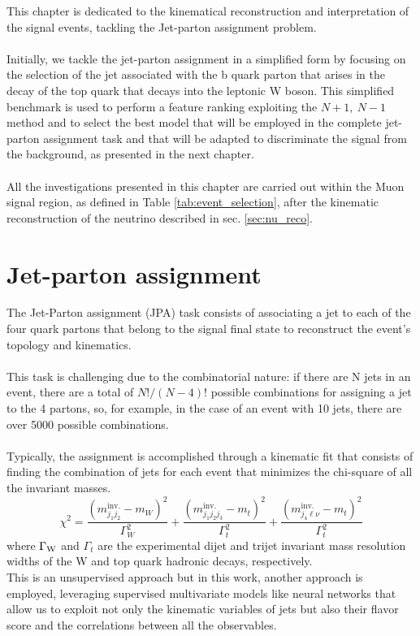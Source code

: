 \label{sec:kin}
\vspace{-1cm}
\minitoc
\vspace{0.5cm}
This chapter is dedicated to the kinematical reconstruction and interpretation of the signal events, tackling the Jet-parton assignment problem.
\\
\\
Initially, we tackle the jet-parton assignment in a simplified form by focusing on the selection of the jet associated with the b quark parton that arises in the decay of the top quark that decays into the leptonic W boson. This simplified benchmark is used to perform a feature ranking exploiting the $N+1,\: N-1$ method and to select the best model that will be employed in the complete jet-parton assignment task and that will be adapted to discriminate the signal from the background, as presented in the next chapter.
\\
\\
All the investigations presented in this chapter are carried out within the Muon signal region, as defined in Table \ref{tab:event_selection}, after the kinematic reconstruction of the neutrino described in sec. \ref{sec:nu_reco}.\\

\section{Jet-parton assignment}
The Jet-Parton assignment (JPA) task consists of associating a jet to each of the four quark partons that belong to the signal final state to reconstruct the event's topology and kinematics.\\
\\
This task is challenging due to the combinatorial nature: if there are N jets in an event, there are a total of $N!/(N-4)!$ possible combinations for assigning a jet to the 4 partons, so, for example, in the case of an event with 10 jets, there are over 5000 possible combinations.\\
\\
Typically, the assignment is accomplished through a kinematic fit that consists of finding the combination of jets for each event that minimizes the chi-square of all the invariant masses.
\begin{equation}
    \chi^2=\frac{(m_{j_1j_2}^{\text{inv.}}-m_W)^2}{\Gamma^2_W}+\frac{(m_{j_1j_2j_3}^{\text{inv.}}-m_t)^2}{\Gamma^2_t}+\frac{(m_{j_4\ell\nu}^{\text{inv.}}-m_t)^2}{\Gamma^2_t}
\end{equation}
where $\Gamma_{\text{W}}$ and $\Gamma_t$ are the experimental dijet and trijet invariant mass resolution widths of the W and top quark hadronic decays, respectively.\\
This is an unsupervised approach but in this work, another approach is employed, leveraging supervised multivariate models like neural networks that allow us to exploit not only the kinematic variables of jets but also their flavor score and the correlations between all the observables.


